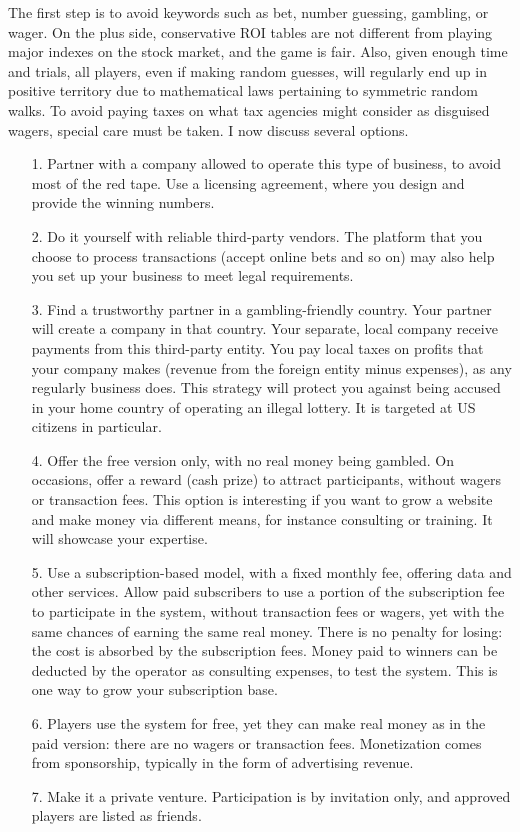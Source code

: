 \documentclass[oneside,10pt]{book}
\begin{document}
The first step is to avoid keywords such as bet, number guessing, gambling, or wager. On the plus side, conservative ROI tables are not different from playing major indexes on the stock market, and the game is fair. Also, given enough time and trials, all players, even if making random guesses, will regularly end up in positive territory due to mathematical laws pertaining to symmetric random walks. To avoid paying taxes on what tax agencies might consider as disguised wagers, special care must be taken. I now discuss 
 several  options.\vspace{1ex}

\begin{itemize}
\item[1.] Partner with a company allowed to operate this type of business, to avoid most of the red tape. Use a licensing agreement, where you design and provide the winning numbers. 
\item[2.] Do it yourself with reliable third-party vendors. The platform that you choose to process transactions (accept online bets and so on) may also help you set up your business to meet legal requirements.
\item[3.] Find a trustworthy partner in a gambling-friendly country. Your partner will create a company in that country. Your separate, local company receive payments from this third-party entity. You pay local taxes on profits that your company makes (revenue from the foreign entity minus expenses), as any regularly business does. This strategy will protect you against being accused in your home country of operating an illegal lottery.  It is targeted at US citizens in particular.
\item[4.] Offer the free version only, with no real money being gambled. On occasions, offer a reward (cash prize) to attract participants,
 without  wagers or transaction fees. This option is interesting if you want to grow a website and make money via different means, for instance consulting or training. It will showcase your expertise. 
\item[5.] Use a subscription-based model, with a fixed monthly fee, offering data and other services. Allow paid subscribers to use
 a portion of the subscription fee to participate in the system, without transaction fees or wagers, yet with the same chances of earning the same real money. There is no penalty for losing: the cost is absorbed by the subscription fees.  Money paid to winners can be deducted by the operator as consulting expenses, to test the system. This is one way to grow your subscription base.
\item[6.] Players use the system for free,  yet they can make real money as in the paid version: there are no wagers or transaction fees. Monetization comes from sponsorship, typically in the form of advertising revenue.  
\item[7.] Make it a private venture. Participation is by invitation only, and approved players are listed as friends.
\end{itemize}\vspace{1ex}
\end{document}
